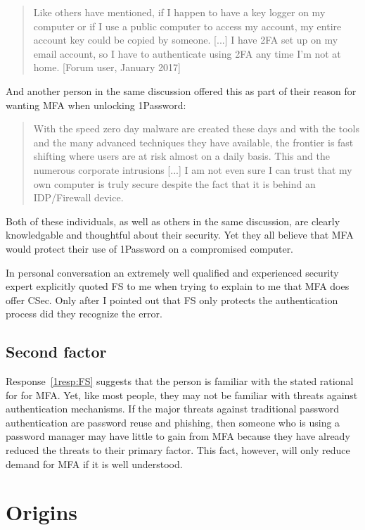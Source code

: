 \documentclass[12pt]{article}
\newcommand{\prop}[1]{\textsf{#1}}
\begin{document}
\begin{quotation}
  Like others have mentioned, if I happen to have a key logger on my computer or if I use a public computer to access my account, my entire account key could be copied by someone. [...] I have 2FA set up on my email account, so I have to authenticate using 2FA any time I'm not at home.
  [Forum user, January 2017]
\end{quotation}

And another person in the same discussion offered this as part of their reason
for wanting MFA when unlocking 1Password:

\begin{quotation}
  With the speed zero day malware are created these days and with the tools and the many advanced techniques they have available, the frontier is fast shifting where users are at risk almost on a daily basis. This and the numerous corporate intrusions [...] I am not even sure I can trust that my own computer is truly secure despite the fact that it is behind an IDP/Firewall device.
\end{quotation}

Both of these individuals, as well as others in the same discussion,
are clearly knowledgable and thoughtful about their security.
Yet they all believe that MFA would protect their use of 1Password on a compromised computer.

In personal conversation an extremely well qualified and experienced security expert explicitly quoted \prop{FS} to me when trying to explain to me that MFA does offer \prop{CSec}. Only after I pointed out that  \prop{FS} only protects the authentication process did they recognize the error.

\subsection{Second factor}

Response~\ref{1resp:FS} suggests that the person is familiar with the stated rational for for MFA\@.
Yet, like most people, they may not be familiar with threats against authentication mechanisms.
If the major threats against traditional password authentication are password reuse and phishing,
then someone who is using a password manager may have little to gain from
MFA because they have already reduced the threats to their primary factor.
This fact, however, will only reduce demand for MFA if it is well understood.

\section{Origins}
\end{document}
